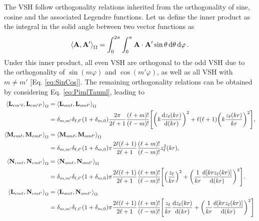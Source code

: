 The VSH follow orthogonality relations inherited from the orthogonality of sine, cosine and the associated Legendre functions. Let us define the inner product as the integral in the solid angle between two vector functions as 
%
\begin{align}
\ev{\vb{A},\vb{A}'}_\Omega = \int_0^{2\pi}\int_0^{\pi} \vb{A}\cdot\vb{A}'\sin\theta\dd{\theta}\dd{\varphi}.
\label{eq:inner}
\end{align}
%
Under this inner product, all even VSH are orthogonal to the odd VSH due to the orthogonality of $\sin(m\varphi)$ and $\cos(m'\varphi)$, as well as all VSH  with $m\neq m'$ [Eq. \eqref{eq:SinCos}]. The remaining orthogonality relations  can be obtained by considering Eq. \eqref{eq:PimlTauml}, leading to 
%
\begin{align}
\ev{\vb{L}_{em'\ell},\vb{L}_{em'\ell'}}_\Omega &= \ev{\vb{L}_{om\ell},\vb{L}_{om\ell'}}_\Omega \notag\\
 &=  \delta_{m,m'}\delta_{\ell,\ell'} (1+\delta_{m,0}) 
 \frac{2\pi}{2\ell+1}\frac{(\ell+m)!}{(\ell-m)!}
 \qty[\qty(k\dv{z_\ell(kr)}{(kr)})^2 + \ell(\ell+1)\qty(k\frac{z_\ell(kr)}{kr})^2],\\
\ev{\vb{M}_{em\ell},\vb{M}_{em\ell'}}_\Omega &= \ev{\vb{M}_{om\ell},\vb{M}_{om\ell'}}_\Omega \notag\\
&= \delta_{m,m'}\delta_{\ell,\ell'} (1+\delta_{m,0}) 
\pi \frac{2  \ell(\ell+1)}{2\ell+1}\frac{(\ell+m)!}{(\ell-m)!}
z_{\ell}^2(kr),\\
%
\ev{\vb{N}_{em\ell},\vb{N}_{em\ell'}}_\Omega &= \ev{\vb{N}_{om\ell},\vb{N}_{om\ell'}}_\Omega  \notag\\
&= \delta_{m,m'}\delta_{\ell,\ell'} (1+\delta_{m,0}) 
\pi \frac{2  \ell(\ell+1)}{2\ell+1}\frac{(\ell+m)!}{(\ell-m)!}
\qty[\qty(\frac{ z_{\ell}}{kr})^2 + \qty(\frac{1}{kr}\dv{[kr z_\ell(kr)]}{(kr)})^2]. \\
\ev{\vb{L}_{em\ell},\vb{N}_{em\ell'}}_\Omega &= \ev{\vb{L}_{om\ell},\vb{N}_{om\ell'}}_\Omega \notag\\
&= \delta_{m,m'}\delta_{\ell,\ell'} (1+\delta_{m,0}) 
\pi \frac{2  \ell(\ell+1)}{2\ell+1}\frac{(\ell+m)!}{(\ell-m)!}
\qty[\frac{ z_{\ell}}{kr}\dv{z_\ell(kr)}{(kr)} + \qty(\frac{1}{kr}\dv{[kr z_\ell(kr)]}{(kr)})^2]
\end{align}
%



